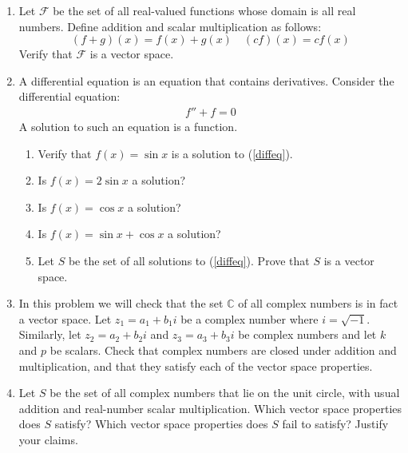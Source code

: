 \documentclass{ximera}
\begin{document}
\begin{enumerate}
 \item 
 Let $\mathcal{F}$ be the set of all real-valued functions whose domain is all real numbers.  Define addition and scalar multiplication as follows:
 $$(f+g)(x)=f(x)+g(x)\quad (cf)(x)=cf(x)$$
 Verify that $\mathcal{F}$ is a vector space.
 \item
 A differential equation is an equation that contains derivatives.  Consider the differential equation:
 \begin{align}\label{diffeq} f''+f=0\end{align}
A solution to such an equation is a function.
  \begin{enumerate}
  \item Verify that $f(x)=\sin x$ is a solution to (\ref{diffeq}).
  \item Is $f(x)=2\sin x$ a solution?
  \item Is $f(x)=\cos x$ a solution?
  \item Is $f(x)=\sin x+\cos x$ a solution?
  \item Let $S$ be the set of all solutions to (\ref{diffeq}).  Prove that $S$ is a vector space.
  \end{enumerate}
\item
In this problem we will check that the set $\mathbb{C}$ of all complex numbers is in fact a vector space.  Let $z_1 = a_1 + b_1 i$ be a complex number where $i=\sqrt{-1}$.  Similarly, let $z_2 = a_2 + b_2 i$ and $z_3 = a_3 + b_3 i$ be complex numbers and let $k$ and $p$ be scalars.  Check that complex numbers are closed under addition and multiplication, and that they satisfy each of the vector space properties.
\item
Let $S$ be the set of all complex numbers that lie on the unit circle, with usual addition and real-number scalar multiplication. 
  Which vector space properties does $S$ satisfy?  Which vector space properties does $S$ fail to satisfy?  Justify your claims.  
  

	

\end{enumerate}
 
\end{document}
